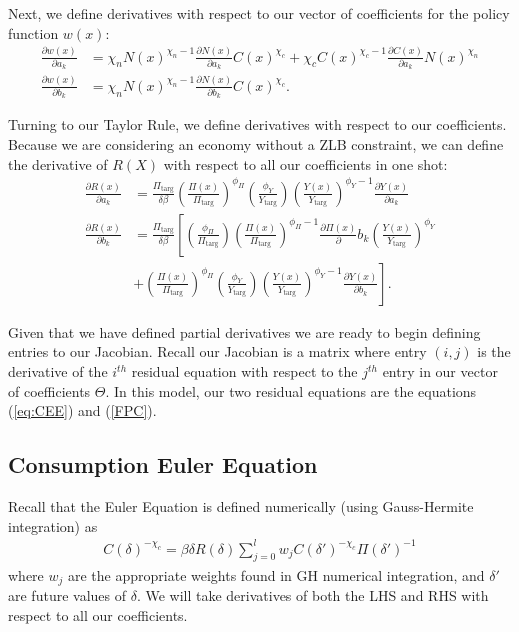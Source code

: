 \documentclass[11pt]{article}
\begin{document}
Next, we define derivatives with respect to our vector of coefficients for the policy function $w(x)$: 
\begin{align}
\frac{\partial w(x)}{\partial a_k} &=\chi_nN(x)^{\chi_n-1}\frac{\partial N(x)}{\partial a_k}C(x)^{\chi_c} + \chi_cC(x)^{\chi_c-1}\frac{\partial C(x)}{\partial a_k}N(x)^{\chi_n} \\ 
\frac{\partial w(x)}{\partial b_k} &=\chi_nN(x)^{\chi_n-1}\frac{\partial N(x)}{\partial b_k}C(x)^{\chi_c}.
\end{align}


Turning to our Taylor Rule, we define derivatives with respect to our coefficients. Because we are considering an economy without a ZLB constraint, we can define the derivative of $R(X)$ with respect to all our coefficients in one shot:
\begin{align}
\frac{\partial R(x)}{\partial a_k} &=\frac{\Pi_{\text{targ}}}{\delta\beta}\left(\frac{\Pi(x)}{\Pi_{\text{targ}}}\right)^{\phi_{\Pi}}\left(\frac{\phi_Y}{Y_{\text{targ}}}\right)\left(\frac{Y(x)}{Y_{\text{targ}}}\right)^{\phi_{Y}-1}\frac{\partial Y(x)}{\partial a_k} \\ 
\frac{\partial R(x)}{\partial b_k} &=\frac{\Pi_{\text{targ}}}{\delta\beta}\left[\left(\frac{\phi_{\Pi}}{\Pi_{\text{targ}}}\right)\left(\frac{\Pi(x)}{\Pi_{\text{targ}}}\right)^{\phi_{\Pi}-1}\frac{\partial \Pi(x)}\partial b_k\left(\frac{Y(x)}{Y_{\text{targ}}}\right)^{\phi_{Y}} \right. \\ \nonumber
& \left. + \left(\frac{\Pi(x)}{\Pi_{\text{targ}}}\right)^{\phi_{\Pi}}\left(\frac{\phi_Y}{Y_{\text{targ}}}\right)\left(\frac{Y(x)}{Y_{\text{targ}}}\right)^{\phi_{Y}-1}\frac{\partial Y(x)}{\partial b_k}\right].
\end{align}

Given that we have defined partial derivatives we are ready to begin defining entries to our Jacobian. Recall our Jacobian is a matrix where entry $(i,j)$ is the derivative of the $i^{th}$ residual equation with respect to the $j^{th}$ entry in our vector of coefficients $\Theta$. In this model, our two residual equations are the equations (\ref{eq:CEE})  and (\ref{FPC}). 

\subsection*{Consumption Euler Equation}
\noindent 
Recall that the Euler Equation is defined numerically (using Gauss-Hermite integration) as 
\begin{align}
	C(\delta)^{-\chi_{c}} = \beta\delta R(\delta) \sum_{j = 0}^{l}w_jC(\delta')^{-\chi_{c}}\Pi(\delta')^{-1}
\end{align}
where $w_j$ are the appropriate weights found in GH numerical integration, and $\delta'$ are future values of $\delta$. We will take derivatives of both the LHS and RHS with respect to all our coefficients.
\end{document}
